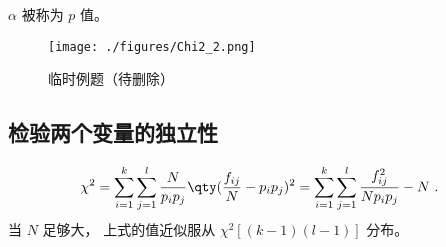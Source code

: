 $\alpha$ 被称为 $p$ 值。

\begin{figure}[ht]
\centering
\texttt{[image: ./figures/Chi2\_2.png]}
\caption{临时例题（待删除）} \label{Chi2_fig2}
\end{figure}

\subsection{检验两个变量的独立性}
\begin{equation}
\chi^2 = \sum_{i=1}^{k} \sum_{j=1}^{l} \frac{N}{p_ip_j} \qty(\frac{f_{ij}}{N} - p_ip_j)^2 = \sum_{i=1}^{k} \sum_{j=1}^{l} \frac{f_{ij}^2}{Np_ip_j} - N~.
\end{equation}
当 $N$ 足够大， 上式的值近似服从 $\chi^2[(k-1)(l-1)]$ 分布。
